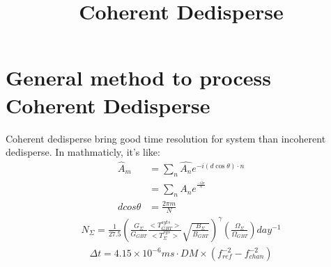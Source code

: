 \documentclass[10pt,a4paper]{article}
\title{Coherent Dedisperse}
\begin{document}
\maketitle
\section{General method to process Coherent Dedisperse}
Coherent dedisperse bring good time resolution for system than incoherent dedisperse. In mathmaticly, it's like:
\begin{align}
\hat{A}_m &= \sum_n \hat{A_n}e^{-i(d\cos\theta)\cdot n} \\
&= \sum_nA_ne^{^{\frac{-i2\pi}{N}}} \\
dcos\theta &= \frac{2 \pi m}{N}
\end{align}
\begin{align*}  
N_\Sigma=\frac{1}{27.5}\left( \frac{G_\Sigma}{G_{GBT}} \frac{<T^{syts}_{GBT}>}{<T^{sys}_\Sigma>}\sqrt{\frac{B_\Sigma}{B_{GBT}}}\right)^\gamma\left( \frac{\Omega_\Sigma}{\Omega_{GBT}}\right)day^{-1}
\end{align*}  
\begin{align}  
\Delta t = 4.15 \times 10 ^{-6}ms \cdot DM \times (f^{-2}_{ref} -f^{-2}_{chan})
\end{align}  
\end{document}
